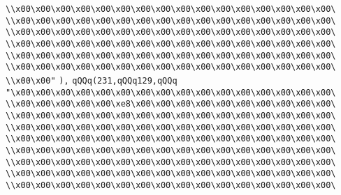 \verb|\\x00\x00\x00\x00\x00\x00\x00\x00\x00\x00\x00\x00\x00\x00\x00\x00\|\newline
\verb|\\x00\x00\x00\x00\x00\x00\x00\x00\x00\x00\x00\x00\x00\x00\x00\x00\|\newline
\verb|\\x00\x00\x00\x00\x00\x00\x00\x00\x00\x00\x00\x00\x00\x00\x00\x00\|\newline
\verb|\\x00\x00\x00\x00\x00\x00\x00\x00\x00\x00\x00\x00\x00\x00\x00\x00\|\newline
\verb|\\x00\x00\x00\x00\x00\x00\x00\x00\x00\x00\x00\x00\x00\x00\x00\x00\|\newline
\verb|\\x00\x00\x00\x00\x00\x00\x00\x00\x00\x00\x00\x00\x00\x00\x00\x00\|\newline
\verb|\\x00\x00"|\newline
\verb|),|\newline
\verb|qQQq(231,qQQq129,qQQq|\newline
\verb|"\x00\x00\x00\x00\x00\x00\x00\x00\x00\x00\x00\x00\x00\x00\x00\x00\|\newline
\verb|\\x00\x00\x00\x00\x00\xe8\x00\x00\x00\x00\x00\x00\x00\x00\x00\x00\|\newline
\verb|\\x00\x00\x00\x00\x00\x00\x00\x00\x00\x00\x00\x00\x00\x00\x00\x00\|\newline
\verb|\\x00\x00\x00\x00\x00\x00\x00\x00\x00\x00\x00\x00\x00\x00\x00\x00\|\newline
\verb|\\x00\x00\x00\x00\x00\x00\x00\x00\x00\x00\x00\x00\x00\x00\x00\x00\|\newline
\verb|\\x00\x00\x00\x00\x00\x00\x00\x00\x00\x00\x00\x00\x00\x00\x00\x00\|\newline
\verb|\\x00\x00\x00\x00\x00\x00\x00\x00\x00\x00\x00\x00\x00\x00\x00\x00\|\newline
\verb|\\x00\x00\x00\x00\x00\x00\x00\x00\x00\x00\x00\x00\x00\x00\x00\x00\|\newline
\verb|\\x00\x00\x00\x00\x00\x00\x00\x00\x00\x00\x00\x00\x00\x00\x00\x00\|\newline
